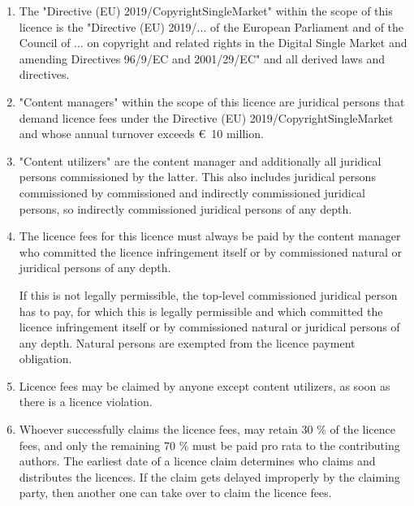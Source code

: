 \documentclass[a4paper,8pt]{extarticle}
\begin{document}
\begin{enumerate}
 \item The "Directive (EU) 2019/CopyrightSingleMarket" within the scope of this licence is the "Directive (EU) 2019/... of the European Parliament and of the Council of ... on copyright and related rights in the Digital Single Market and amending Directives 96/9/EC and 2001/29/EC" and all derived laws and directives.


 \item "Content managers" within the scope of this licence are juridical persons that demand licence fees under the Directive (EU) 2019/CopyrightSingleMarket and whose annual turnover exceeds \euro\ 10 million.

 \item "Content utilizers" are the content manager and additionally all juridical persons commissioned by the latter. This also includes juridical persons commissioned by commissioned and indirectly commissioned juridical persons, so indirectly commissioned juridical persons of any depth.

 \item The licence fees for this licence must always be paid by the content manager who committed the licence infringement itself or by commissioned natural or juridical persons of any depth.
 
 If this is not legally permissible, the top-level commissioned juridical person has to pay, for which this is legally permissible and which committed the licence infringement itself or by commissioned natural or juridical persons of any depth. Natural persons are exempted from the licence payment obligation.

 \item Licence fees may be claimed by anyone except content utilizers, as soon as there is a licence violation.

 \item Whoever successfully claims the licence fees, may retain 30 \% of the licence fees, and only the remaining 70 \% must be paid pro rata to the contributing authors. The earliest date of a licence claim determines who claims and distributes the licences. If the claim gets delayed improperly by the claiming party, then another one can take over to claim the licence fees.


\end{enumerate}
\end{document}
